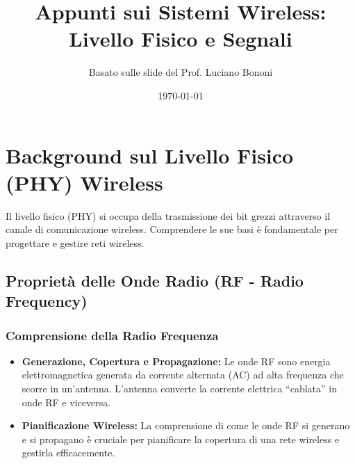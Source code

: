 \documentclass{article}
\title{Appunti sui Sistemi Wireless: Livello Fisico e Segnali}
\author{Basato sulle slide del Prof. Luciano Bononi}
\date{\today}
\begin{document}
\maketitle
\tableofcontents
\newpage

\section{Background sul Livello Fisico (PHY) Wireless}
Il livello fisico (PHY) si occupa della trasmissione dei bit grezzi attraverso il canale di comunicazione wireless. Comprendere le sue basi è fondamentale per progettare e gestire reti wireless.

\subsection{Proprietà delle Onde Radio (RF - Radio Frequency)}

\subsubsection{Comprensione della Radio Frequenza}
\begin{itemize}
    \item \textbf{Generazione, Copertura e Propagazione:} Le onde RF sono energia elettromagnetica generata da corrente alternata (AC) ad alta frequenza che scorre in un'antenna. L'antenna converte la corrente elettrica ``cablata'' in onde RF e viceversa.
    \item \textbf{Pianificazione Wireless:} La comprensione di come le onde RF si generano e si propagano è cruciale per pianificare la copertura di una rete wireless e gestirla efficacemente.
\end{itemize}
\begin{center}
\end{center}
\end{document}
